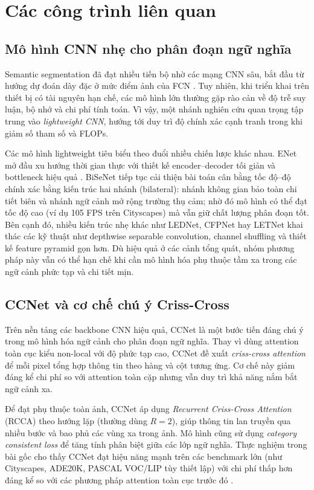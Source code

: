 \section{Các công trình liên quan}
\subsection{Mô hình CNN nhẹ cho phân đoạn ngữ nghĩa}
Semantic segmentation đã đạt nhiều tiến bộ nhờ các mạng CNN sâu, bắt đầu từ hướng dự đoán dày đặc ở mức điểm ảnh của FCN \cite{long2015fcn}. Tuy nhiên, khi triển khai trên thiết bị có tài nguyên hạn chế, các mô hình lớn thường gặp rào cản về độ trễ suy luận, bộ nhớ và chi phí tính toán. Vì vậy, một nhánh nghiên cứu quan trọng tập trung vào \emph{lightweight CNN}, hướng tới duy trì độ chính xác cạnh tranh trong khi giảm số tham số và FLOPs.

Các mô hình lightweight tiêu biểu theo đuổi nhiều chiến lược khác nhau. ENet mở đầu xu hướng thời gian thực với thiết kế encoder--decoder tối giản và bottleneck hiệu quả \cite{paszke2016enet}. BiSeNet \cite{bisenet} tiếp tục cải thiện bài toán cân bằng tốc độ--độ chính xác bằng kiến trúc hai nhánh (bilateral): nhánh không gian bảo toàn chi tiết biên và nhánh ngữ cảnh mở rộng trường thụ cảm; nhờ đó mô hình có thể đạt tốc độ cao (ví dụ 105 FPS trên Cityscapes) mà vẫn giữ chất lượng phân đoạn tốt. Bên cạnh đó, nhiều kiến trúc nhẹ khác như LEDNet, CFPNet hay LETNet khai thác các kỹ thuật như depthwise separable convolution, channel shuffling và thiết kế feature pyramid gọn hơn. Dù hiệu quả ở các cảnh tổng quát, nhóm phương pháp này vẫn có thể hạn chế khi cần mô hình hóa phụ thuộc tầm xa trong các ngữ cảnh phức tạp và chi tiết mịn.

\subsection{CCNet và cơ chế chú ý Criss-Cross}
Trên nền tảng các backbone CNN hiệu quả, CCNet \cite{ccnet} là một bước tiến đáng chú ý trong mô hình hóa ngữ cảnh cho phân đoạn ngữ nghĩa. Thay vì dùng attention toàn cục kiểu non-local với độ phức tạp cao, CCNet đề xuất \emph{criss-cross attention} để mỗi pixel tổng hợp thông tin theo hàng và cột tương ứng. Cơ chế này giảm đáng kể chi phí so với attention toàn cặp nhưng vẫn duy trì khả năng nắm bắt ngữ cảnh xa.

Để đạt phụ thuộc toàn ảnh, CCNet áp dụng \emph{Recurrent Criss-Cross Attention} (RCCA) theo hướng lặp (thường dùng $R=2$), giúp thông tin lan truyền qua nhiều bước và bao phủ các vùng xa trong ảnh. Mô hình cũng sử dụng \emph{category consistent loss} để tăng tính phân biệt giữa các lớp ngữ nghĩa. Thực nghiệm trong bài gốc cho thấy CCNet đạt hiệu năng mạnh trên các benchmark lớn (như Cityscapes, ADE20K, PASCAL VOC/LIP tùy thiết lập) với chi phí thấp hơn đáng kể so với các phương pháp attention toàn cục trước đó \cite{ccnet}.

